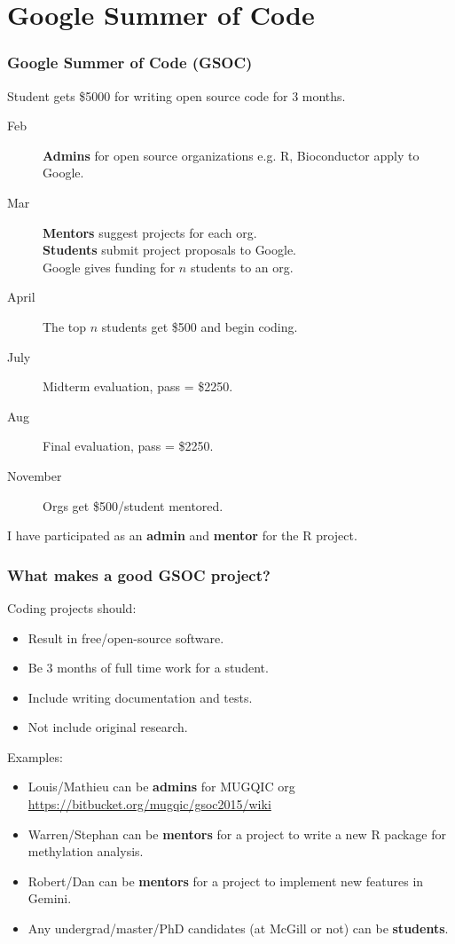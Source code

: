 \documentclass{beamer}
\begin{document}
\section{Google Summer of Code}

\begin{frame}
  \frametitle{Google Summer of Code (GSOC)}
Student gets \$5000 for writing open source code for
    3 months.
    \begin{description}
    \item[Feb] \textbf{Admins} for open source organizations
      e.g. R, Bioconductor apply to Google.
    \item[Mar] \textbf{Mentors} suggest projects for each org.\\
      \textbf{Students} submit project proposals to Google.\\
      Google gives funding for $n$ students to an org.
    \item[April] The top $n$ students get \$500 and begin coding.
    \item[July] Midterm evaluation, pass = \$2250.
    \item[Aug] Final evaluation, pass = \$2250.
    \item[November] Orgs get \$500/student mentored.
    \end{description}

  I have participated as an \textbf{admin} and \textbf{mentor} for the
  R project.
\end{frame}

\begin{frame}
  \frametitle{What makes a good GSOC project?}
  Coding projects should:
  \begin{itemize}
  \item Result in free/open-source software.
  \item Be 3 months of full time work for a student.
  \item Include writing documentation and tests.
  \item Not include original research.
  \end{itemize}
  Examples: 
  \begin{itemize}
  \item Louis/Mathieu can be \textbf{admins} for MUGQIC org\\
    \alert{\url{https://bitbucket.org/mugqic/gsoc2015/wiki}}
  \item Warren/Stephan can be \textbf{mentors} for a project to write
    a new R package for methylation analysis.
  \item Robert/Dan can be \textbf{mentors} for a project to implement
    new features in Gemini.
  \item Any undergrad/master/PhD candidates (at McGill or not)
    can be \textbf{students}.
  \end{itemize}
  
\end{frame}
\end{document}
